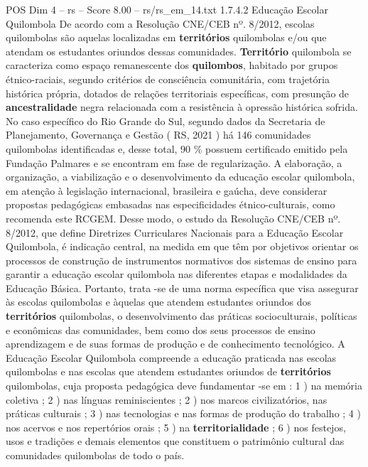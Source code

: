 \begin{textsample}{POS Dim 4 – rs – Score 8.00 – rs/rs\_em\_14.txt}  \label{ex:f4_pos_100}
1.7.4.2 Educação Escolar Quilombola De acordo com a Resolução CNE/CEB nº. 8/2012, escolas quilombolas são aquelas localizadas em \textbf{territórios} quilombolas e/ou que atendam os estudantes oriundos dessas comunidades. \textbf{Território} quilombola se caracteriza como espaço remanescente dos \textbf{quilombos}, habitado por grupos étnico-raciais, segundo critérios de consciência comunitária, com trajetória histórica própria, dotados de relações territoriais específicas, com presunção de \textbf{ancestralidade} negra relacionada com a resistência à opressão histórica sofrida.
No caso específico do Rio Grande do Sul, segundo dados da Secretaria de Planejamento, Governança e Gestão ( RS, 2021 ) há 146 comunidades quilombolas identificadas e, desse total, 90 \% possuem certificado emitido pela Fundação Palmares e se encontram em fase de regularização.
A elaboração, a organização, a viabilização e o desenvolvimento da educação escolar quilombola, em atenção à legislação internacional, brasileira e gaúcha, deve considerar propostas pedagógicas embasadas nas especificidades étnico-culturais, como recomenda este RCGEM.
Desse modo, o estudo da Resolução CNE/CEB nº. 8/2012, que define Diretrizes Curriculares Nacionais para a Educação Escolar Quilombola, é indicação central, na medida em que têm por objetivos orientar os processos de construção de instrumentos normativos dos sistemas de ensino para garantir a educação escolar quilombola nas diferentes etapas e modalidades da Educação Básica.
Portanto, trata -se de uma norma específica que visa assegurar às escolas quilombolas e àquelas que atendem estudantes oriundos dos \textbf{territórios} quilombolas, o desenvolvimento das práticas socioculturais, políticas e econômicas das comunidades, bem como dos seus processos de ensino aprendizagem e de suas formas de produção e de conhecimento tecnológico.
A Educação Escolar Quilombola compreende a educação praticada nas escolas quilombolas e nas escolas que atendem estudantes oriundos de \textbf{territórios} quilombolas, cuja proposta pedagógica deve fundamentar -se em : 1 ) na memória coletiva ; 2 ) nas línguas reminiscientes ; 2 ) nos marcos civilizatórios, nas práticas culturais ; 3 ) nas tecnologias e nas formas de produção do trabalho ; 4 ) nos acervos e nos repertórios orais ; 5 ) na \textbf{territorialidade} ; 6 ) nos festejos, usos e tradições e demais elementos que constituem o patrimônio cultural das comunidades quilombolas de todo o país.

\end{textsample}
